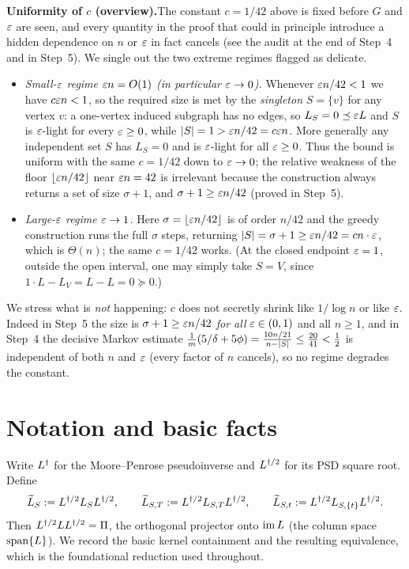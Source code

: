 \medskip
\noindent\textbf{Uniformity of $c$ (overview).}\quad The constant $c=1/42$ above
is fixed before $G$ and $\varepsilon$ are seen, and every quantity in the proof that
could in principle introduce a hidden dependence on $n$ or $\varepsilon$ in fact
cancels (see the audit at the end of Step~4 and in Step~5). We single out the two
extreme regimes flagged as delicate.
\begin{itemize}
\item\emph{Small-$\varepsilon$ regime $\varepsilon n=O(1)$ \textup{(}in particular
$\varepsilon\to0$\textup{)}.} Whenever $\varepsilon n/42<1$ we have $c\varepsilon n<1$, so
the required size is met by the \emph{singleton} $S=\{v\}$ for any vertex $v$:
a one-vertex induced subgraph has no edges, so $L_S=0\preceq\varepsilon L$ and $S$ is
$\varepsilon$-light for every $\varepsilon\ge0$, while $|S|=1>\varepsilon n/42=c\varepsilon n$.
More generally any independent set $S$ has $L_S=0$ and is $\varepsilon$-light for all
$\varepsilon\ge0$. Thus the bound is uniform with the same $c=1/42$ down to
$\varepsilon\to0$; the relative weakness of the floor $\lfloor\varepsilon n/42\rfloor$
near $\varepsilon n=42$ is irrelevant because the construction always returns a set of
size $\sigma+1$, and $\sigma+1\ge\varepsilon n/42$ (proved in Step~5).
\item\emph{Large-$\varepsilon$ regime $\varepsilon\to1$.} Here $\sigma=\lfloor\varepsilon
n/42\rfloor$ is of order $n/42$ and the greedy construction runs the full
$\sigma$ steps, returning $|S|=\sigma+1\ge\varepsilon n/42=cn\cdot\varepsilon$, which is
$\Theta(n)$; the same $c=1/42$ works. \textup{(}At the closed endpoint
$\varepsilon=1$, outside the open interval, one may simply take $S=V$, since
$1\cdot L-L_V=L-L=0\succeq0$.\textup{)}
\end{itemize}
\noindent We stress what is \emph{not} happening: $c$ does not secretly shrink
like $1/\log n$ or like $\varepsilon$. Indeed in Step~5 the size is $\sigma+1\ge
\varepsilon n/42$ \emph{for all} $\varepsilon\in(0,1)$ and all $n\ge1$, and in Step~4 the
decisive Markov estimate $\frac1m(5/\delta+5\phi)=\frac{10n/21}{\,n-|S|\,}\le
\frac{20}{41}<\frac12$ is independent of both $n$ and $\varepsilon$ (every factor of
$n$ cancels), so no regime degrades the constant.

\section*{Notation and basic facts}

Write $L^{\dagger}$ for the Moore--Penrose pseudoinverse and $L^{\dagger/2}$ for its PSD square
root. Define
\[
  \widetilde{L}_S      := L^{\dagger/2} L_S L^{\dagger/2}, \qquad
  \widetilde{L}_{S,T}  := L^{\dagger/2} L_{S,T}  L^{\dagger/2}, \qquad
  \widetilde{L}_{S,t}  := L^{\dagger/2} L_{S,\{t\}}L^{\dagger/2}.
\]
Then $L^{\dagger/2} L L^{\dagger/2} = \Pi$, the orthogonal projector onto $\operatorname{im} L$
(the column space $\operatorname{span}\{L\}$). We record the basic kernel containment and
the resulting equivalence, which is the foundational reduction used throughout.

